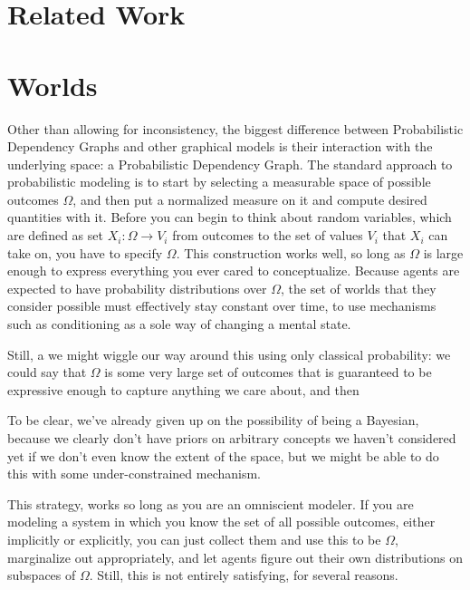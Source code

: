 \documentclass{article}
\newcommand{\modelname}{Probabilistic Dependency Graph}
\begin{document}
	
	\section{Related Work}
	
	\section{Worlds}
	Other than allowing for inconsistency, the biggest difference between \modelname{}s and other graphical models is their interaction with the underlying space: a \modelname . The standard approach to probabilistic modeling is to start by selecting a measurable space of possible outcomes $\Omega$, and then put a normalized measure on it and compute desired quantities with it. Before you can begin to think about random variables, which are defined as set $X_i : \Omega \to V_i$ from outcomes to the set of values $V_i$ that $X_i$ can take on, you have to specify $\Omega$. This construction works well, so long as $\Omega$ is large enough to express everything you ever cared to conceptualize. Because agents are expected to have probability distributions over $\Omega$, the set of worlds that they consider possible must effectively stay constant over time, to use mechanisms such as conditioning as a sole way of changing a mental state. 
	
	Still, a we might wiggle our way around this using only classical probability: we could say that $\Omega$ is some very large set of outcomes that is guaranteed to be expressive enough to capture anything we care about, and then 
	
	To be clear, we've already given up on the possibility of being a Bayesian, because we clearly don't have priors on arbitrary concepts we haven't considered yet if we don't even know the extent of the space, but we might be able to do this with some under-constrained mechanism. 
	
	This strategy, works so long as you are an omniscient modeler. If you are modeling a system in which you know the set of all possible outcomes, either implicitly or explicitly, you can just collect them and use this to be $\Omega$, marginalize out appropriately, and let agents figure out their own distributions on subspaces of $\Omega$. Still, this is not entirely satisfying, for several reasons. 
	
\end{document}
